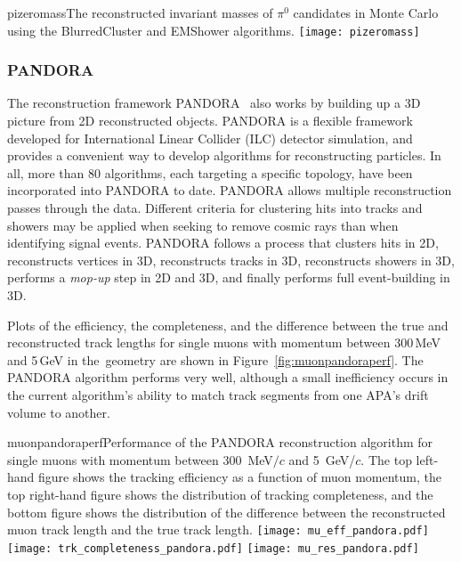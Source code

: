 \begin{cdrfigure}{pizeromass}{The reconstructed invariant masses of $\pi^0$ candidates in
  Monte Carlo using the BlurredCluster and EMShower algorithms.}
\texttt{[image: pizeromass]}
\end{cdrfigure}

\subsubsection{PANDORA}

The reconstruction framework PANDORA~\cite{Marshall:2015rfa} also works by
building up a 3D picture from 2D
reconstructed objects.  PANDORA is a flexible framework developed for
International Linear Collider (ILC) detector simulation, and provides a convenient way to develop
algorithms for reconstructing particles.  In all, more than 80
algorithms, each targeting a specific topology, have been incorporated
into PANDORA to date.  PANDORA allows multiple reconstruction passes through the data.  
Different criteria for clustering hits into tracks and
showers may be applied when seeking to remove cosmic rays %
than when
identifying signal events.  PANDORA follows a process that clusters hits in 2D,
reconstructs vertices in 3D, reconstructs tracks in 3D,
reconstructs showers in 3D, performs a \textit{mop-up} step in 2D and 3D, and finally performs
full event-building in 3D.


Plots of the efficiency, the completeness, and the  difference between the true and reconstructed
track lengths for single muons with momentum between 300\,MeV and 5\,GeV in the~\pdsp geometry are
shown in Figure~\ref{fig:muonpandoraperf}.  The PANDORA algorithm performs very well, although a small
inefficiency occurs in the current algorithm's ability to match track segments from one APA's drift volume to another.

\begin{cdrfigure}{muonpandoraperf}{Performance of the PANDORA reconstruction algorithm for single muons with 
momentum between 300~MeV$/c$ and 5~GeV/$c$.  The top left-hand figure shows the tracking efficiency as a function of
muon momentum, the top right-hand figure shows the distribution of tracking completeness, and the bottom figure shows the
distribution of the difference between the reconstructed muon track length and the true track length.}
\texttt{[image: mu\_eff\_pandora.pdf]}
\texttt{[image: trk\_completeness\_pandora.pdf]}
\texttt{[image: mu\_res\_pandora.pdf]}
\end{cdrfigure}


